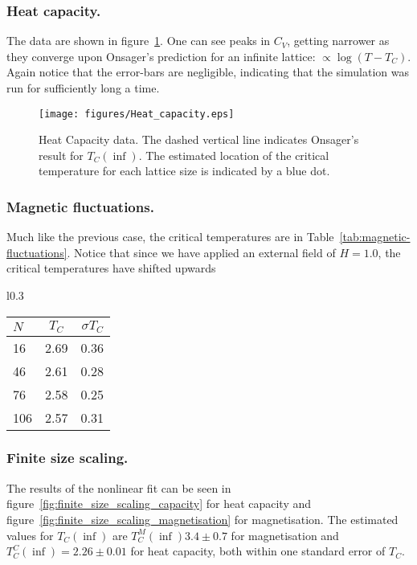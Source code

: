\documentclass[12pt]{article}
\begin{document}
\subsubsection{Heat capacity.}

The data are shown in figure~\ref{fig:capacity_plot}. One can see peaks in \(C_V\), getting narrower as they converge upon Onsager's prediction for an infinite lattice: \( \propto \log ( T - T_C)\). Again notice that the error-bars are negligible, indicating that the simulation was run for sufficiently long a time. 

\begin{figure}[hp]
  \texttt{[image: figures/Heat\_capacity.eps]}
  \caption[capacity_plot]{Heat Capacity data. The dashed vertical line indicates Onsager's result for \(T_C(\inf)\). The estimated location of the critical temperature for each lattice size is indicated by a blue dot. }\label{fig:capacity_plot}
\end{figure}

\subsubsection{Magnetic  fluctuations.}

Much like the previous case, the critical temperatures are in Table~\ref{tab:magnetic-fluctuations}. Notice that since we have applied an external field of \(H = 1.0\), the critical temperatures have shifted upwards

\begin{wraptable}{l}{0.3\textwidth}  
  \caption{Critical temperatures from magnetic fluctuations}\label{tab:magnetic-fluctuations}

    \begin{tabular}{l|c|r}
      \(N\) & \(T_C\) & \(\sigma T_C\)\\
      \hline
      16 & 2.69 & 0.36 \\
      46 & 2.61 & 0.28 \\
      76 & 2.58 & 0.25\\
      106& 2.57 & 0.31\\
    \end{tabular}
\end{wraptable}

\subsubsection{Finite size scaling.}

The results of the nonlinear fit can be seen in figure~\ref{fig:finite_size_scaling_capacity} for heat capacity and figure~\ref{fig:finite_size_scaling_magnetisation} for magnetisation. The estimated values for \(T_C (\inf)\) are \( T_C ^{M} (\inf)  3.4 \pm  0.7\) for magnetisation and \( T_C^{C}(\inf)  = 2.26 \pm 0.01\) for heat capacity, both within one standard error of \(T_C\).
\end{document}
